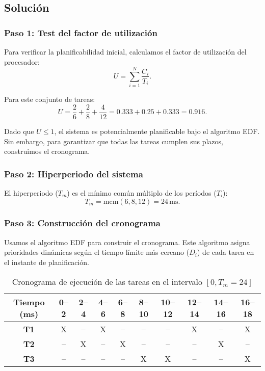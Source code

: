 \documentclass[a4paper,12pt]{article}
\begin{document}
\subsection{Solución}
\subsubsection{Paso 1: Test del factor de utilización}
Para verificar la planificabilidad inicial, calculamos el factor de utilización del procesador:
\[
U = \sum_{i=1}^{N} \frac{C_i}{T_i}.
\]

Para este conjunto de tareas:
\[
U = \frac{2}{6} + \frac{2}{8} + \frac{4}{12} = 0.333 + 0.25 + 0.333 = 0.916.
\]

Dado que \(U \leq 1\), el sistema es potencialmente planificable bajo el algoritmo EDF. Sin embargo, para garantizar que todas las tareas cumplen sus plazos, construimos el cronograma.

\subsubsection{Paso 2: Hiperperiodo del sistema}
El hiperperiodo (\(T_m\)) es el mínimo común múltiplo de los períodos (\(T_i\)):
\[
T_m = \text{mcm}(6, 8, 12) = 24 \, \text{ms}.
\]

\subsubsection{Paso 3: Construcción del cronograma}
Usamos el algoritmo EDF para construir el cronograma. Este algoritmo asigna prioridades dinámicas según el tiempo límite más cercano (\(D_i\)) de cada tarea en el instante de planificación.

\begin{table}[H]
\centering
\begin{tabular}{|c|c|c|c|c|c|c|c|c|c|}
\hline
\textbf{Tiempo (ms)} & 0--2 & 2--4 & 4--6 & 6--8 & 8--10 & 10--12 & 12--14 & 14--16 & 16--18 \\ \hline
\textbf{T1} & X & -- & X & -- & -- & -- & X & -- & X \\ \hline
\textbf{T2} & -- & X & -- & X & -- & -- & -- & X & -- \\ \hline
\textbf{T3} & -- & -- & -- & -- & X & X & -- & -- & X \\ \hline
\end{tabular}
\caption{Cronograma de ejecución de las tareas en el intervalo \([0, T_m = 24]\)}
\end{table}
\end{document}
